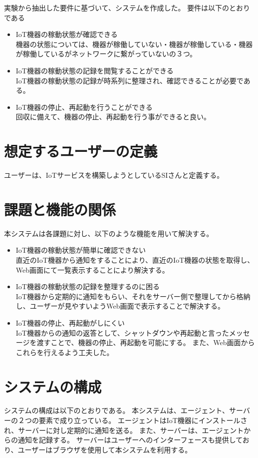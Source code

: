 実験から抽出した要件に基づいて、システムを作成した。
要件は以下のとおりである
\begin{itemize}
	\item IoT機器の稼動状態が確認できる\\
		機器の状態については、機器が稼働していない・機器が稼働している・機器が稼働しているがネットワークに繋がっていないの３つ。
	\item IoT機器の稼動状態の記録を閲覧することができる\\
		IoT機器の稼動状態の記録が時系列に整理され、確認できることが必要である。
	\item IoT機器の停止、再起動を行うことができる\\
		回収に備えて、機器の停止、再起動を行う事ができると良い。
\end{itemize}

\section{想定するユーザーの定義}
ユーザーは、IoTサービスを構築しようとしているSIさんと定義する。

\section{課題と機能の関係}
本システムは各課題に対し、以下のような機能を用いて解決する。
\begin{itemize}
\item IoT機器の稼動状態が簡単に確認できない\\
	直近のIoT機器から通知をすることにより、直近のIoT機器の状態を取得し、Web画面にて一覧表示することにより解決する。
\item IoT機器の稼動状態の記録を整理するのに困る\\
	IoT機器から定期的に通知をもらい、それをサーバー側で整理してから格納し、ユーザーが見やすいようWeb画面で表示することで解決する。
\item IoT機器の停止、再起動がしにくい\\
	IoT機器からの通知の返答として、シャットダウンや再起動と言ったメッセージを渡すことで、機器の停止、再起動を可能にする。
	また、Web画面からこれらを行えるよう工夫した。
\end{itemize}

\section{システムの構成}
システムの構成は以下のとおりである。
本システムは、エージェント、サーバーの２つの要素で成り立っている。
エージェントはIoT機器にインストールされ、サーバーに対し定期的に通知を送る。
また、サーバーは、エージェントからの通知を記録する。
サーバーはユーザーへのインターフェースも提供しており、ユーザーはブラウザを使用して本システムを利用する。

